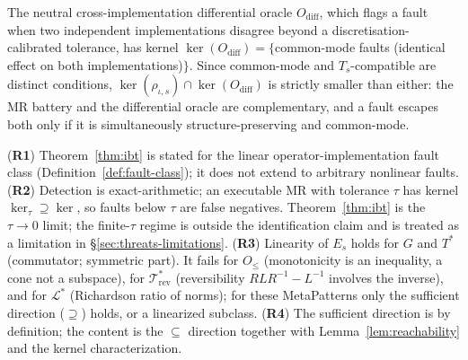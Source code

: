 \begin{corollary*}
The neutral cross-implementation differential oracle $O_{\mathrm{diff}}$, which flags
a fault when two independent implementations disagree beyond a discretisation-
calibrated tolerance, has kernel $\ker(O_{\mathrm{diff}})=\{$common-mode faults
(identical effect on both implementations)$\}$. Since common-mode and
$T_s$-compatible are distinct conditions, $\ker(\rho_{\iota,s})\cap\ker(O_{\mathrm{diff}})$
is strictly smaller than either: the MR battery and the differential oracle are
complementary, and a fault escapes both only if it is simultaneously
structure-preserving and common-mode.
\end{corollary*}

\begin{remark}
\label{rem:ibt-scope}
(\textbf{R1}) Theorem~\ref{thm:ibt} is stated for the linear operator-implementation
fault class (Definition~\ref{def:fault-class}); it does not extend to arbitrary
nonlinear faults. (\textbf{R2}) Detection is exact-arithmetic; an executable MR with
tolerance $\tau$ has kernel $\ker_\tau\supseteq\ker$, so faults below $\tau$ are
false negatives. Theorem~\ref{thm:ibt} is the $\tau\to0$ limit; the finite-$\tau$
regime is outside the identification claim and is treated as a limitation in
\S\ref{sec:threats-limitations}.
(\textbf{R3}) Linearity of $E_s$ holds for $G$ and $T^{*}$ (commutator; symmetric
part). It fails for $O_\le$ (monotonicity is an inequality, a cone not a subspace),
for $\mathcal{T}^{*}_{\mathrm{rev}}$ (reversibility $R L R^{-1}-L^{-1}$ involves the inverse), and
for $\mathcal{L}^{*}$ (Richardson ratio of norms); for these MetaPatterns only the sufficient
direction ($\supseteq$) holds, or a linearized subclass. (\textbf{R4}) The sufficient
direction is by definition; the content is the $\subseteq$ direction together with
Lemma~\ref{lem:reachability} and the kernel characterization.
\end{remark}
